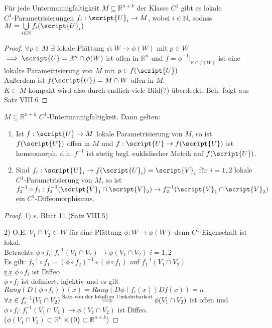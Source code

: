   \begin{lemma}
    Für jede Untermannigfaltigkeit $M \subseteq \mathbb{R}^{n+k}$ der Klasse $C^1$ gibt es lokale\\
    $C^1$-Parametrisierungen $f_i:\script{U}_i \to M$, wobei $i\in\mathbb{N}$, sodass $M = \bigcup\limits_{i \in \mathbb{N}} f_i(\script{U}_i)$
  \end{lemma}
  \begin{proof}
    $\forall p\in M$ $\exists$ lokale Plättung $\phi: W \to \phi(W)$ mit $p\in W$ \\
    $\implies \script{U} = \mathbb{R}^n \cap \phi(W)$ ist offen in $\mathbb{R}^n$ und $f = \phi^{-1}|_{\mathbb{R}\cap \phi(W)}$ ist eine lokalte Parametrisierung von $M$ mit $p\in f(\script{U})$ \\
    Außerdem ist $f(\script{U}) = M\cap W$ offen in $M$. \\
    $K\subset M$ kompakt wird also durch endlich viele Bild(?) überdeckt. Beh. folgt aus Satz VIII.6
  \end{proof}

  \begin{theorem}
    $M \subseteq \mathbb{R}^{n+k}$ $C^1$-Untermannigfaltigkeit. Dann gelten:
    \begin{enumerate}
      \item Ist $f: \script{U} \to M$ lokale Parametrisierung von $M$, so ist $f(\script{U})$ offen in $M$ und $f: \script{U} \to f(\script{U})$ ist homeomorph, d.h. $f^{-1}$ ist stetig bzgl. euklidischer Metrik auf $f(\script{U})$.
      \item Sind $f_i:\script{U}_i \to f(\script{U}_i) = \script{V}_i$ für $i = 1,2$ lokale $C^1$-Parametrisierung von $M$, so ist $f_2^{-1}\circ f_1: f_1^{-1}(\script{V}_1\cap\script{V}_2) \to f_2^{-1}(\script{V}_1\cap\script{V}_2)$ ein $C^1$-Diffeomorphismus. 
    \end{enumerate}
  \end{theorem}
  \begin{proof}
    \item[1)] s. Blatt 11 (Satz VIII.5) \\
    \item[2)] O.E. $V_1 \cap V_2 \subset W$ für eine Plättung $\phi: W \to \phi(W)$ denn $C^1$-Eigenschaft ist lokal. \\
    Betrachte $\phi \circ f_i: f_i^{-1}(V_1\cap V_2) \to \phi(V_1\cap V_2)$ $i=1,2$ \\
    Es gilt: $f_2^{-1} \circ f_1 = (\phi\circ f_2)^{-1} \circ (\phi\circ f_1)$ auf $f_1^{-1}(V_1\cap V_2)$ \\
    \underline{z.z} $\phi\circ f_i$ ist Diffeo \\
    $\phi\circ f_i$ ist definiert, injektiv und es gilt $Rang (D(\phi\circ f_i)) (x) = Rang (D\phi(f_i(x)) Df(x)) = n$ $\forall x\in f_i^{-1}(V_1 \cap V_2) \\
    \overset{\text{Satz von der lokalten Umkehrbarkeit}}{\implies} \phi(V_1 \cap V_2)$ ist offen und $\phi\circ f_i: f_i^{-1}(V_1\cap V_2) \to \phi(V_1 \cap V_2)$ ist Diffeo. \\
    ($\phi(V_1\cap V_2)\subset \mathbb{R}^n\times \{0\} \subset \mathbb{R}^{n+k}$)
    
  \end{proof}

